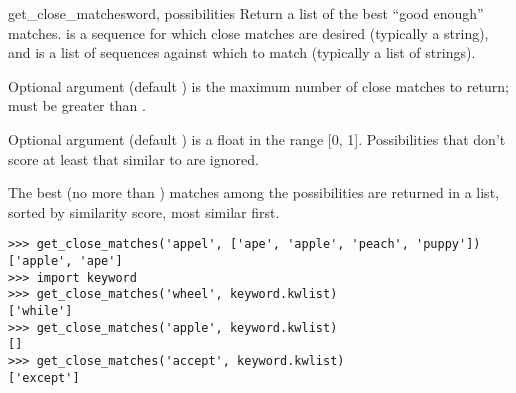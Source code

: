 \begin{funcdesc}{get_close_matches}{word, possibilities}
  Return a list of the best ``good enough'' matches.   is a
  sequence for which close matches are desired (typically a string),
  and  is a list of sequences against which to
  match  (typically a list of strings).

  Optional argument  (default ) is the maximum number
  of close matches to return;  must be greater than .

  Optional argument  (default ) is a float in
  the range [0, 1].  Possibilities that don't score at least that
  similar to  are ignored.

  The best (no more than ) matches among the possibilities are
  returned in a list, sorted by similarity score, most similar first.

\begin{verbatim}
>>> get_close_matches('appel', ['ape', 'apple', 'peach', 'puppy'])
['apple', 'ape']
>>> import keyword
>>> get_close_matches('wheel', keyword.kwlist)
['while']
>>> get_close_matches('apple', keyword.kwlist)
[]
>>> get_close_matches('accept', keyword.kwlist)
['except']
\end{verbatim}
\end{funcdesc}

